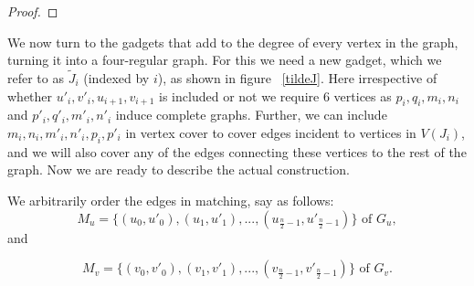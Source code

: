 \documentclass[svgnames]{llncs}
\begin{document}
{\begin{proof}
\iffalse
\begin{itemize}
 \item $ p-VC(G_x) \Longrightarrow (p+ 2n)-VC(\hat{G_x})$ :
Consider a vertex cover $V_c$ of $G_x$.
$\forall (x_i,x'_i) \in M_x$, $V_c \cap \{x_i,x'_i\} \neq \varnothing$. So for each $J_{x_i}$ corrosponding to $(x_i,x'_i) \in M_x$ we need exactly 4 more vertices 
to cover $E(J_{x_i}) \cup \{(x_i,s_{x_i}),(t_{x_i},x'_i)\}$ by lemma ~\ref{VCJ}.
But $ \lvert M_x \rvert =n/2$, so $p+4\frac{n}{2}=p+2n$ vertices are sufficient to cover $E(\hat{G_x})$.

\item $(p+ 2n)-VC(\hat{G_x}) \Longrightarrow p-VC(G_x)$ 
Let $V_c$ be a $(p+2n)-VC(\hat{G_x})$, and $V'=V_c \cap V(G_x)$. Then $V'$ covers all edges in $G_x$ except possibly edges $(x_i,x'_i) \in M_x$
For each gadget $J_{x_i}$ inserted between $(x_i,x'_i) \in M_x$ we know if both of $x_i,x'_i \notin VC(\hat{G_i})$ then from lemma ~\ref{VCJ} we require
5 more vertex to cover $E(\hat{G_x}) \cup \{(x_i,s_{x_i}),(t_{x_i},x'_i)\}$.
For covering the edge $x_i,x'_i$ in $G_x$ we need at least one of $x_i,x'_i$, so we modify $VC(\hat{G_x})$ to include any one of $x_i,x'_i$ and 4 more vertices from $V(J_{x_i})$.
So that $V'$ forms a $p-$vertex cover for $G_x$.


\end{itemize}
\fi

\end{proof}


We now turn to the gadgets that add to the degree of every vertex in the graph, turning it into a four-regular graph. For this we need a new gadget, which we refer to as $\tilde{J}_i$ (indexed by $i$), as shown in figure ~\ref{tildeJ}. Here irrespective of whether $u'_i,v'_i,u_{i+1},v_{i+1}$ is 
included or not we require $6$ vertices as $p_i,q_i,m_i,n_i$ and
$p'_i,q'_i,m'_i,n'_i$ induce complete graphs. Further, we can include $m_i,n_i,m'_i,n'_i,p_i,p'_i$ in vertex cover to cover edges incident to vertices in $V(J_i)$, and we will also cover any of the edges connecting these vertices to the rest of the graph. Now we are ready to describe the actual construction.  




We arbitrarily order the edges in matching, say as follows:
$$M_u=\{(u_0,u'_0),(u_1,u'_1),...,(u_{\frac{n}{2}-1},u'_{\frac{n}{2}-1})\}\mbox{ of }G_u,$$ and

$$M_v=\{(v_0,v'_0),(v_1,v'_1),...,(v_{\frac{n}{2}-1},v'_{\frac{n}{2}-1})\}\mbox{ of }G_v.$$ 

}
\end{document}
